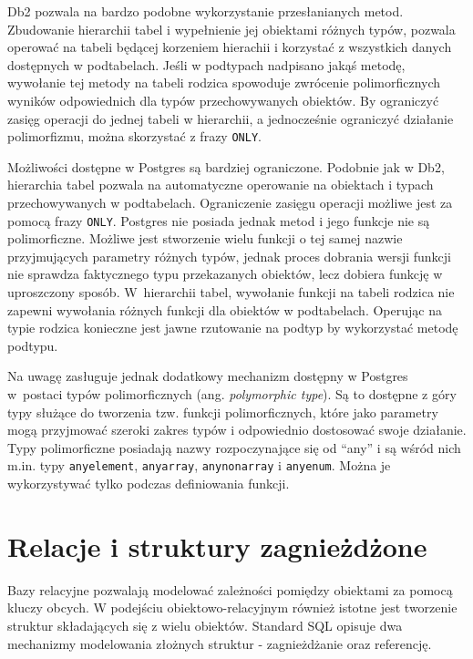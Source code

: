 \documentclass[a4paper,twoside,12pt]{book}
\begin{document}
Db2 pozwala na bardzo podobne wykorzystanie przesłanianych metod. Zbudowanie hierarchii tabel i wypełnienie jej obiektami różnych typów, pozwala operować na tabeli będącej korzeniem hierachii i korzystać z wszystkich danych dostępnych w podtabelach. Jeśli w podtypach nadpisano jakąś metodę, wywołanie tej metody na tabeli rodzica spowoduje zwrócenie polimorficznych wyników odpowiednich dla typów przechowywanych obiektów. By ograniczyć zasięg operacji do jednej tabeli w hierarchii, a jednocześnie ograniczyć działanie polimorfizmu, można skorzystać z frazy \lstinline{ONLY}.

Możliwości dostępne w Postgres są bardziej ograniczone. Podobnie jak w Db2, hierarchia tabel pozwala na automatyczne operowanie na obiektach i typach przechowywanych w podtabelach. Ograniczenie zasięgu operacji możliwe jest za pomocą frazy \lstinline{ONLY}. Postgres nie posiada jednak metod i jego funkcje nie są polimorficzne. Możliwe jest stworzenie wielu funkcji o tej samej nazwie przyjmujących parametry różnych typów, jednak proces dobrania wersji funkcji nie sprawdza faktycznego typu przekazanych obiektów, lecz dobiera funkcję w uproszczony sposób. W~hierarchii tabel, wywołanie funkcji na tabeli rodzica nie zapewni wywołania różnych funkcji dla obiektów w podtabelach. Operując na typie rodzica konieczne jest jawne rzutowanie na podtyp by wykorzystać metodę podtypu.

Na uwagę zasługuje jednak dodatkowy mechanizm dostępny w Postgres w~postaci typów polimorficznych (ang. \textit{polymorphic type}). Są to dostępne z góry typy służące do tworzenia tzw. funkcji polimorficznych, które jako parametry mogą przyjmować szeroki zakres typów i odpowiednio dostosować swoje działanie. Typy polimorficzne posiadają nazwy rozpoczynające się od ``any'' i są wśród nich m.in. typy \mbox{\lstinline{anyelement},} \lstinline{anyarray}, \lstinline{anynonarray} i \lstinline{anyenum}. Można je wykorzystywać tylko podczas definiowania funkcji.

\section{Relacje i struktury zagnieżdżone}

Bazy relacyjne pozwalają modelować zależności pomiędzy obiektami za pomocą kluczy obcych. W podejściu obiektowo-relacyjnym również istotne jest tworzenie struktur składających się z wielu obiektów. Standard SQL opisuje dwa mechanizmy modelowania złożnych struktur - zagnieżdżanie oraz referencję.  
\end{document}
